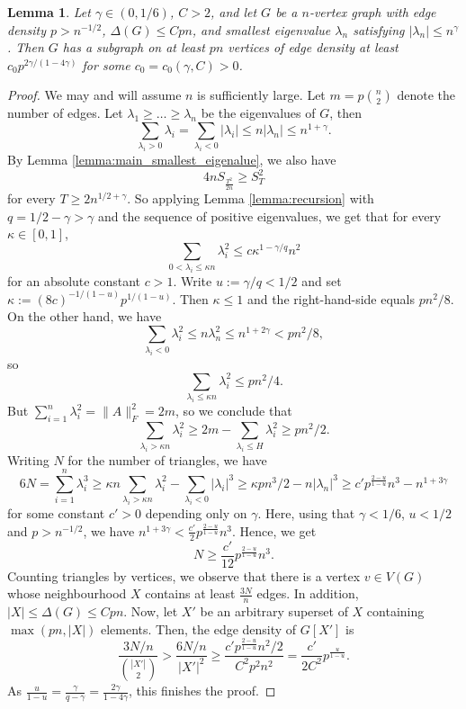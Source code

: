 \documentclass[11pt]{article}
\theoremstyle{plain}
\newtheorem{lemma}[theorem]{Lemma}
\theoremstyle{definition}
\begin{document}
\begin{lemma}\label{lemma:dens1_triangle_counting}
Let $\gamma\in (0,1/6)$, $C>2$, and let $G$ be a $n$-vertex graph with  edge density $p>n^{-1/2}$, $\Delta(G)\leq Cpn$, and smallest eigenvalue $\lambda_n$ satisfying $|\lambda_n|\leq n^\gamma$. Then $G$ has a subgraph on at least $pn$ vertices of edge density at least $c_0 p^{2\gamma/(1-4\gamma)}$ for some $c_0=c_0(\gamma,C)>0$.
\end{lemma}
\begin{proof}
    We may and will assume $n$ is sufficiently large.
    Let $m=p\binom{n}{2}$ denote the number of edges. Let $\lambda_1\geq\dots\geq\lambda_{n}$ be the eigenvalues of $G$, then $$\sum_{\lambda_i>0}\lambda_i=\sum_{\lambda_i<0}|\lambda_i|\leq n|\lambda_n|\leq n^{1+\gamma}.$$
    By Lemma \ref{lemma:main_smallest_eigenalue}, we also have
    $$4nS_{\frac{T^2}{2n}}\geq S_T^2$$
    for every $T\geq 2n^{1/2+\gamma}$. 
    So applying Lemma \ref{lemma:recursion} with $q=1/2-\gamma>\gamma$ and the sequence of positive eigenvalues, we get that for every $\kappa\in [0,1]$,
    $$\sum_{0<\lambda_i\leq \kappa n}\lambda_i^2\leq c\kappa^{1-\gamma/q}n^{2}$$
    for an absolute constant $c>1$. 
    Write $u:=\gamma/q<1/2$ and set $\kappa:=(8c)^{-1/(1-u)}p^{1/(1-u)}$.
    Then $\kappa\leq 1$ and the right-hand-side equals $pn^2/8$. On the other hand, we have $$\sum_{\lambda_i<0} \lambda_i^2\leq n\lambda_n^2\leq n^{1+2\gamma}<pn^2/8,$$ so
    $$\sum_{\lambda_i\leq \kappa n} \lambda_i^2\leq pn^2/4.$$
    But $\sum_{i=1}^n\lambda_i^2=\|A\|_F^2=2m$, so we conclude that
    $$\sum_{\lambda_i>\kappa n}\lambda_i^2\geq 2m-\sum_{\lambda_i\leq H}\lambda_i^2\geq pn^2/2.$$
    Writing $N$ for the number of triangles, we have
    $$6N=\sum_{i=1}^n\lambda_i^3
        \geq \kappa n\sum_{\lambda_i> \kappa n}\lambda_i^2-\sum_{\lambda_i<0}|\lambda_i|^3
        \geq \kappa pn^3/2-n|\lambda_n|^3\geq c'p^{\frac{2-u}{1-u}}n^{3}-n^{1+3\gamma}$$
    for some constant $c'>0$ depending only on $\gamma$. 
    Here, using that $\gamma<1/6$, $u<1/2$ and $p>n^{-1/2}$, we have $n^{1+3\gamma}< \frac{c'}{2}p^{\frac{2-u}{1-u}}n^{3}$. 
    Hence, we get
    $$N\geq \frac{c'}{12}p^{\frac{2-u}{1-u}}n^{3}.$$
    Counting triangles by vertices, we observe that there is a vertex $v\in V(G)$ whose neighbourhood $X$ contains at least $\frac{3N}{n}$ edges.
    In addition, $|X|\leq \Delta(G)\leq Cpn$. 
    Now, let $X'$ be an arbitrary superset of $X$ containing $\max(pn,|X|)$ elements.
    Then, the edge density of $G[X']$ is 
    $$\frac{3N/n}{\binom{|X'|}{2}}
        > \frac{6N/n}{|X'|^2} 
        \ge \frac{c'p^{\frac{2-u}{1-u}}n^{2}/2}{C^2p^2n^2}
        = \frac{c'}{2C^2}p^{\frac{u}{1-u}}.$$
    As $\frac{u}{1-u}=\frac{\gamma}{q-\gamma}=\frac{2\gamma}{1-4\gamma}$, this finishes the proof.
\end{proof}
\end{document}
